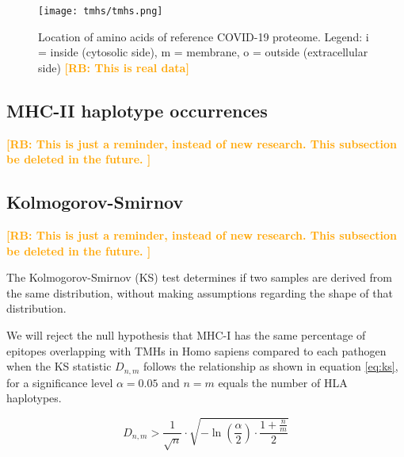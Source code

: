 \documentclass{article}
\newcommand{\richel}[1]{\textcolor{orange}{\textbf{[RB: #1]}}}
\begin{document}
\begin{figure}[!htbp]
  \texttt{[image: tmhs/tmhs.png]}
  \caption{
    Location of amino acids of reference COVID-19 proteome.
    Legend: i = inside (cytosolic side), m = membrane, o = outside (extracellular side)
    \richel{This is real data}
  }
  \label{fig:covid_locatome}
\end{figure}


\subsection{MHC-II haplotype occurrences}

\richel{
  This is just a reminder, instead of new research. 
  This subsection be deleted in the future.
}

\begin{table}
  
  \caption{
    Percentage of MHC-II haplotypes, from \cite{greenbaum2011functional}
    \richel{
      This is just a reminder, instead of new research. 
      This table be deleted in the future.
    }
  }
  \label{table:bbbq_2_percentages}
\end{table}

\subsection{Kolmogorov-Smirnov}

\richel{
  This is just a reminder, instead of new research. 
  This subsection be deleted in the future.
}

The Kolmogorov-Smirnov (KS) test determines if two samples
are derived from the same distribution, without making assumptions
regarding the shape of that distribution. 

We will reject
the null hypothesis that MHC-I has the same percentage of epitopes 
overlapping with TMHs in Homo sapiens compared to each pathogen when 
the KS statistic $D_{n,m}$ follows the relationship as shown in 
equation \ref{eq:ks}, for a significance level $\alpha = 0.05$
and $n = m$ equals the number of HLA haplotypes.

\begin{equation}
   D_{n,m} > \frac{1}{\sqrt{n}} \cdot \sqrt{ -\ln(\frac{\alpha}{2}) \cdot \frac{1 + \frac{n}{m}}{2} }
   \label{eq:ks}
\end{equation}
\end{document}
